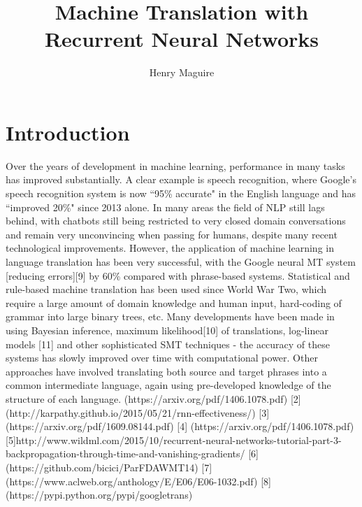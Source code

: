 \documentclass[]{article}
\title{Machine Translation with Recurrent Neural Networks}
\author{Henry Maguire}
\begin{document}
\maketitle


\section{Introduction}
Over the years of development in machine learning, performance in many tasks has improved substantially. A clear example is speech recognition, where Google's speech recognition system is now ``95\% accurate" in the English language and has ``improved 20\%" since 2013 alone. In many areas the field of NLP still lags behind, with chatbots still being restricted to very closed domain conversations and remain very unconvincing when passing for humans, despite many recent technological improvements. However, the application of machine learning in language translation has been very successful, with the Google neural MT system [reducing errors][9] by 60\% compared with phrase-based systems. Statistical and rule-based machine translation has been used since World War Two, which require a large amount of domain knowledge and human input, hard-coding of grammar into large binary trees, etc. Many developments have been made in using Bayesian inference, maximum likelihood[10] of translations, log-linear models [11] and other sophisticated SMT techniques - the accuracy of these systems has slowly improved over time with computational power. Other approaches have involved translating both source and target phrases into a common intermediate language, again using pre-developed knowledge of the structure of each language.
\iffalse
[1](https://arxiv.org/pdf/1406.1078.pdf)
[2] (http://karpathy.github.io/2015/05/21/rnn-effectiveness/)
[3] (https://arxiv.org/pdf/1609.08144.pdf)
[4] (https://arxiv.org/pdf/1406.1078.pdf)
[5]http://www.wildml.com/2015/10/recurrent-neural-networks-tutorial-part-3-backpropagation-through-time-and-vanishing-gradients/
[6](https://github.com/bicici/ParFDAWMT14)
[7](https://www.aclweb.org/anthology/E/E06/E06-1032.pdf)
[8](https://pypi.python.org/pypi/googletrans)
\end{document}
